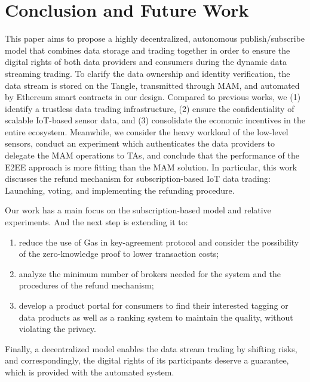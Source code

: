 \documentclass[10pt, conference, compsocconf]{IEEEtran}
\begin{document}
\section{Conclusion and Future Work}
\label{section:conclusion}
This paper aims to propose a highly decentralized, autonomous publish/subscribe model that combines data storage and trading together in order to ensure the digital rights of both data providers and consumers during the dynamic data streaming trading. To clarify the data ownership and identity verification, the data stream is stored on the Tangle, transmitted through MAM, and automated by Ethereum smart contracts in our design. Compared to previous works, we (1) identify a trustless data trading infrastructure, (2) ensure the confidentiality of scalable IoT-based sensor data, and (3) consolidate the economic incentives in the entire ecosystem. Meanwhile, we consider the heavy workload of the low-level sensors, conduct an experiment which authenticates the data providers to delegate the MAM operations to TAs, and conclude that the performance of the E2EE approach is more fitting than the MAM solution. In particular, this work discusses the refund mechanism for subscription-based IoT data trading: Launching, voting, and implementing the refunding procedure.

Our work has a main focus on the subscription-based model and relative experiments. And the next step is extending it to:
\begin{enumerate}
    \item reduce the use of Gas in key-agreement protocol and consider the possibility of the zero-knowledge proof to lower transaction costs;
    \item analyze the minimum number of brokers needed for the system and the procedures of the refund mechanism;
    \item develop a product portal for consumers to find their interested tagging or data products as well as a ranking system to maintain the quality, without violating the privacy.
\end{enumerate}

Finally, a decentralized model enables the data stream trading by shifting risks, and correspondingly, the digital rights of its participants deserve a guarantee, which is provided with the automated system.



\end{document}
